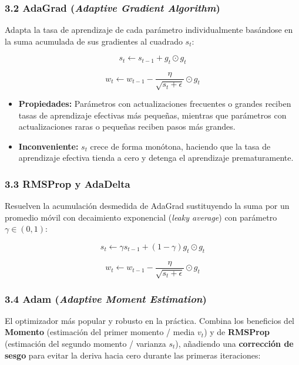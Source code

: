 \documentclass[11pt,oneside]{article}
\begin{document}
\subsubsection{3.2 AdaGrad (\emph{Adaptive Gradient Algorithm})}

Adapta la tasa de aprendizaje de cada parámetro individualmente basándose en la suma acumulada de sus gradientes al cuadrado \(s_t\):

\[s_t \leftarrow s_{t-1} + g_t \odot g_t\]

\[w_t \leftarrow w_{t-1} - \frac{\eta}{\sqrt{s_t + \epsilon}} \odot g_t\]

\begin{itemize}

\item \textbf{Propiedades:} Parámetros con actualizaciones frecuentes o grandes reciben tasas de aprendizaje efectivas más pequeñas, mientras que parámetros con actualizaciones raras o pequeñas reciben pasos más grandes.

\end{itemize}

\begin{itemize}

\item \textbf{Inconveniente:} \(s_t\) crece de forma monótona, haciendo que la tasa de aprendizaje efectiva tienda a cero y detenga el aprendizaje prematuramente.

\end{itemize}

\subsubsection{3.3 RMSProp y AdaDelta}

Resuelven la acumulación desmedida de AdaGrad sustituyendo la suma por un promedio móvil con decaimiento exponencial (\emph{leaky average}) con parámetro \(\gamma \in (0, 1)\):

\[s_t \leftarrow \gamma s_{t-1} + (1 - \gamma) g_t \odot g_t\]

\[w_t \leftarrow w_{t-1} - \frac{\eta}{\sqrt{s_t + \epsilon}} \odot g_t\]

\subsubsection{3.4 Adam (\emph{Adaptive Moment Estimation})}

El optimizador más popular y robusto en la práctica. Combina los beneficios del \textbf{Momento} (estimación del primer momento / media \(v_t\)) y de \textbf{RMSProp} (estimación del segundo momento / varianza \(s_t\)), añadiendo una \textbf{corrección de sesgo} para evitar la deriva hacia cero durante las primeras iteraciones:
\end{document}
